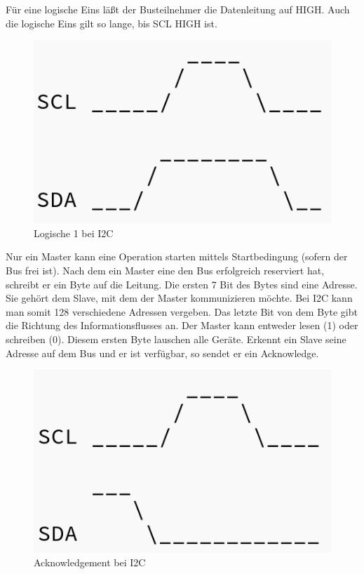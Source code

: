 Für eine logische Eins läßt der Busteilnehmer die Datenleitung auf HIGH. Auch die logische Eins gilt so lange, bis SCL HIGH ist. 

\begin{figure}[h!] 
\includegraphics[scale=0.3]{bilder/i2c_1}
\caption{Logische 1 bei \ac{I2C}}
\label{i2c_1}
\end{figure}

Nur ein Master kann eine Operation starten mittels Startbedingung (sofern der Bus frei ist). Nach dem ein Master eine den Bus erfolgreich reserviert hat, schreibt er ein Byte auf die Leitung. Die ersten 7 Bit des Bytes sind eine Adresse. Sie gehört dem Slave, mit dem der Master kommunizieren möchte. Bei \ac{I2C}  kann man somit 128 verschiedene Adressen vergeben. Das letzte Bit von dem Byte gibt die Richtung des Informationsflusses an. Der Master kann entweder lesen (1) oder schreiben (0). Diesem ersten Byte lauschen alle Geräte. Erkennt ein Slave seine Adresse auf dem Bus und er ist verfügbar, so sendet er ein Acknowledge.

\begin{figure}[h!] 
\includegraphics[scale=0.3]{bilder/i2c_ack}
\caption{Acknowledgement bei \ac{I2C}}
\label{i2c_ack}
\end{figure}



